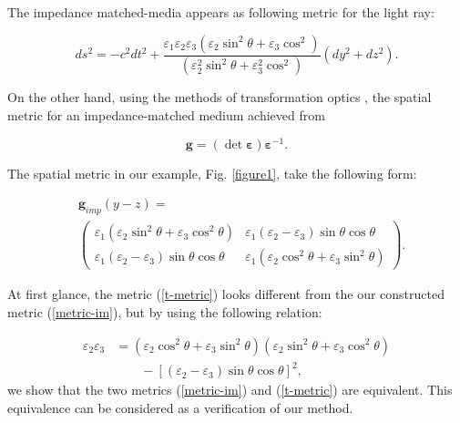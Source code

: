 \documentclass[9pt,twocolumn,twoside]{osajnl}
\begin{document}
 The impedance matched-media appears as following metric for the light ray:

\begin{equation}\label{metric-im}
ds^{2}=- c^{2}dt^{2} + \dfrac{\varepsilon_{1}\varepsilon_{2}\varepsilon_{3}\left({\varepsilon_{2} \sin^{2}{\theta} + \varepsilon_{3}\cos^{2}}\right)}{\left({\varepsilon_{2}^{2} \sin^{2}{\theta} + \varepsilon_{3}^{2}\cos^{2}}\right)} {(dy^{2}+dz^{2})}.
\end{equation}

On the other hand, using the methods of transformation optics \cite{leonhardt2012geometry}, the spatial metric for an impedance-matched medium achieved from 

\begin{equation}
\mathbf{g}=(\det{ \boldsymbol{\varepsilon}})\boldsymbol{\varepsilon}^{-1}.
\end{equation}

The spatial metric in our example, Fig. \ref{figure1}, take the following form: 

\begin{align}\label{t-metric}
&\mathbf{g}_{imp}(y-z)= \nonumber\\
&\begin{pmatrix}
\varepsilon_{1}(\varepsilon_{2} \sin^{2}{\theta} +\varepsilon_{3}\cos^{2}{\theta})& \varepsilon_{1}(\varepsilon_{2}-\varepsilon_{3})\sin{\theta} \cos{\theta}\\
\varepsilon_{1}(\varepsilon_{2}-\varepsilon_{3})\sin{\theta} \cos{\theta}&\varepsilon_{1}(\varepsilon_{2} \cos^2{\theta} +\varepsilon_{3}\sin^{2}{\theta})
\end{pmatrix}.
\end{align}

At first glance, the metric (\ref{t-metric}) looks different from the our constructed metric (\ref{metric-im}), but by using the following relation:  

\begin{equation}\label{dz}
\begin{split}
\varepsilon_{2} \varepsilon_{3}&=(\varepsilon_{2} \cos^2{\theta} +\varepsilon_{3}\sin^{2}{\theta})(\varepsilon_{2} \sin^{2}{\theta} +\varepsilon_{3}\cos^{2}{\theta})  \\
&   \qquad  -\left[ (\varepsilon_{2}-\varepsilon_{3})\sin{\theta} \cos{\theta}\right]^{2},
\end{split}
\end{equation}
 we show that the two metrics (\ref{metric-im}) and (\ref{t-metric}) are equivalent.
 This equivalence can be considered as a verification of our method. 
 
\end{document}
